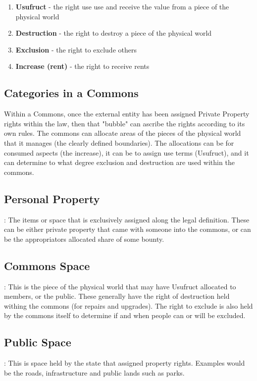 \documentclass{article}
\begin{document}
\begin{enumerate}
	
	\item \textbf{Usufruct} - the right use use and receive the value from a piece of the physical world

	\item \textbf{Destruction} - the right to destroy a piece of the physical world

	\item \textbf{Exclusion} -  the right to exclude others
 
	\item \textbf{Increase (rent)} - the right to receive rents
\end{enumerate}
	

\subsection{Categories in a Commons}

Within a Commons, once the external entity has been assigned Private Property rights within the law, then that "bubble" can ascribe the rights according to its own rules. The commons can allocate areas of the pieces of the physical world that it manages (the clearly defined boundaries). The allocations can be for consumed aspects (the increase), it can be to assign use terms (Usufruct), and it can determine to what degree exclusion and destruction are used within the commons.

\subsection{Personal Property}: The items or space that is exclusively assigned along the legal definition. These can be either private property that came with someone into the commons, or can be the appropriators allocated share of some bounty. 

\subsection{Commons Space}: This is the piece of the physical world that may have Usufruct allocated to members, or the public. These generally have the right of destruction held withing the commons (for repairs and upgrades). The right to exclude is also held by the commons itself to determine if and when people can or will be excluded. 
 
\subsection{Public Space}: This is space held by the state that assigned property rights. Examples would be the roads, infrastructure and public lands such as parks. 
\end{document}
